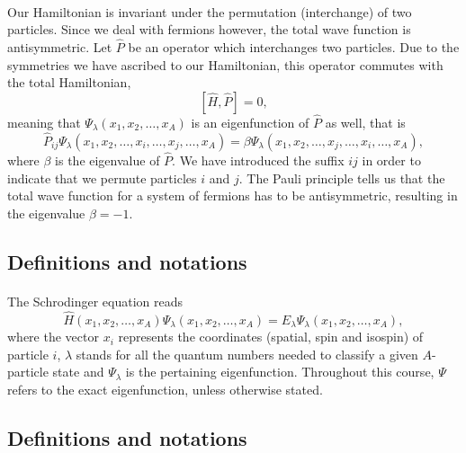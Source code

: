 \documentclass[%
twoside,                 %
final,                   %
10pt]{article}
\begin{document}
\paragraph{}
Our Hamiltonian is invariant under the permutation (interchange) of two particles.
Since we deal with fermions however, the total wave function is antisymmetric.
Let $\hat{P}$ be an operator which interchanges two particles.
Due to the symmetries we have ascribed to our Hamiltonian, this operator commutes with the total Hamiltonian,
\[
[\hat{H},\hat{P}] = 0,
\]
meaning that $\Psi_{\lambda}(x_1, x_2, \dots , x_A)$ is an eigenfunction of 
$\hat{P}$ as well, that is
\[
\hat{P}_{ij}\Psi_{\lambda}(x_1, x_2, \dots,x_i,\dots,x_j,\dots,x_A)=
\beta\Psi_{\lambda}(x_1, x_2, \dots,x_j,\dots,x_i,\dots,x_A),
\]
where $\beta$ is the eigenvalue of $\hat{P}$. We have introduced the suffix $ij$ in order to indicate that we permute particles $i$ and $j$.
The Pauli principle tells us that the total wave function for a system of fermions
has to be antisymmetric, resulting in the eigenvalue $\beta = -1$.




\subsection*{Definitions and notations}

\paragraph{}
The Schrodinger equation reads 
\begin{equation}
\hat{H}(x_1, x_2, \dots , x_A) \Psi_{\lambda}(x_1, x_2, \dots , x_A) = 
E_\lambda  \Psi_\lambda(x_1, x_2, \dots , x_A), \label{eq:basicSE1}
\end{equation}
where the vector $x_i$ represents the coordinates (spatial, spin and isospin) of particle $i$, $\lambda$ stands  for all the quantum
numbers needed to classify a given $A$-particle state and $\Psi_{\lambda}$ is the pertaining eigenfunction.  Throughout this course,
$\Psi$ refers to the exact eigenfunction, unless otherwise stated.



\subsection*{Definitions and notations}
\end{document}
